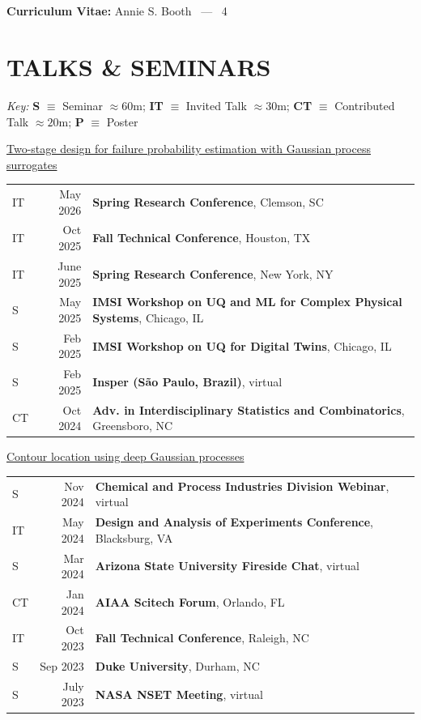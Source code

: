 \documentclass[margin,line,11pt]{res}
\begin{document}
\begin{resume}
\pagebreak
\section{}
\hfill {\bf Curriculum Vitae:} Annie S. Booth \  --- \  4
\medskip

\section{\bf TALKS \& SEMINARS}
{\em Key:}
{\bf S} $\equiv$ Seminar $\approx60$m;
{\bf IT} $\equiv$ Invited Talk $\approx30$m;
{\bf CT} $\equiv$ Contributed Talk $\approx20$m; 
{\bf P} $\equiv$ Poster %

\underline{Two-stage design for failure probability estimation with Gaussian process surrogates}\\
\begin{tabular}{lrl}
IT\quad\quad & May 2026 & {\bf Spring Research Conference}, Clemson, SC \\
IT\quad\quad & Oct 2025 & {\bf Fall Technical Conference}, Houston, TX \\
IT\quad\quad & June 2025 & {\bf Spring Research Conference}, New York, NY \\
S\quad\quad & May 2025 & {\bf IMSI Workshop on UQ and ML for Complex Physical Systems}, Chicago, IL \\
S\quad\quad & Feb 2025 & {\bf IMSI Workshop on UQ for Digital Twins}, Chicago, IL \\
S\quad\quad & Feb 2025 & {\bf Insper (S\~ao Paulo, Brazil)}, virtual \\
CT\quad\quad & Oct 2024 & {\bf Adv. in Interdisciplinary Statistics and Combinatorics}, Greensboro, NC \\
\end{tabular}


\underline{Contour location using deep Gaussian processes}\\
\begin{tabular}{lrl}
S\quad\quad & Nov 2024 & {\bf Chemical and Process Industries Division Webinar}, virtual \\
IT\quad\quad & May 2024 & {\bf Design and Analysis of Experiments Conference}, Blacksburg, VA \\
S\quad\quad & Mar 2024 & {\bf Arizona State University Fireside Chat}, virtual \\
CT\quad\quad & Jan 2024 & {\bf AIAA Scitech Forum}, Orlando, FL \\
IT\quad\quad & Oct 2023 & {\bf Fall Technical Conference}, Raleigh, NC \\
S\quad\quad & Sep 2023 & {\bf Duke University}, Durham, NC \\ 
S\quad\quad & July 2023 & {\bf NASA NSET Meeting}, virtual \\
\end{tabular}


\end{resume}
\end{document}
